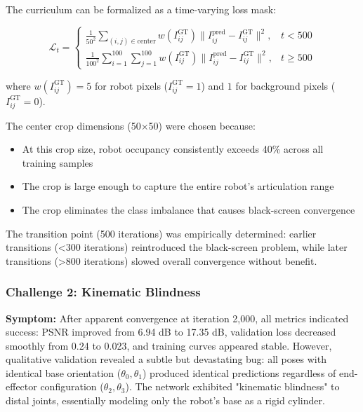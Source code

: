 \documentclass[12pt,a4paper,oneside]{report}
\begin{document}
The curriculum can be formalized as a time-varying loss mask:

\begin{equation}
\mathcal{L}_t = \begin{cases}
\frac{1}{50^2} \sum_{(i,j) \in \text{center}} w(I_{ij}^{\text{GT}}) \|I_{ij}^{\text{pred}} - I_{ij}^{\text{GT}}\|^2, & t < 500 \\
\frac{1}{100^2} \sum_{i=1}^{100}\sum_{j=1}^{100} w(I_{ij}^{\text{GT}}) \|I_{ij}^{\text{pred}} - I_{ij}^{\text{GT}}\|^2, & t \geq 500
\end{cases}
\end{equation}

where $w(I_{ij}^{\text{GT}}) = 5$ for robot pixels ($I_{ij}^{\text{GT}} = 1$) and $1$ for background pixels ($I_{ij}^{\text{GT}} = 0$).

The center crop dimensions (50×50) were chosen because:

\begin{itemize}
    \item At this crop size, robot occupancy consistently exceeds 40\% across all training samples
    \item The crop is large enough to capture the entire robot's articulation range
    \item The crop eliminates the class imbalance that causes black-screen convergence
\end{itemize}

The transition point (500 iterations) was empirically determined: earlier transitions (<300 iterations) reintroduced the black-screen problem, while later transitions (>800 iterations) slowed overall convergence without benefit.

\subsubsection{Challenge 2: Kinematic Blindness}

\textbf{Symptom:} After apparent convergence at iteration 2,000, all metrics indicated success: PSNR improved from 6.94 dB to 17.35 dB, validation loss decreased smoothly from 0.24 to 0.023, and training curves appeared stable. However, qualitative validation revealed a subtle but devastating bug: all poses with identical base orientation ($\theta_0, \theta_1$) produced identical predictions regardless of end-effector configuration ($\theta_2, \theta_3$). The network exhibited "kinematic blindness" to distal joints, essentially modeling only the robot's base as a rigid cylinder.
\end{document}
